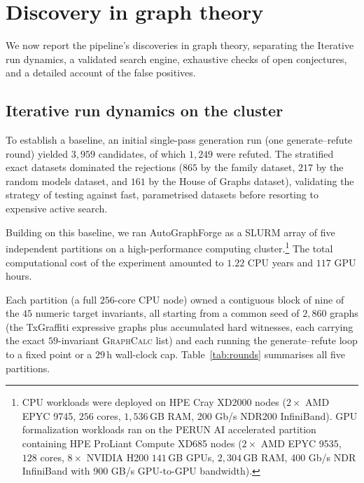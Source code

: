 \documentclass[]{ceurart}
\begin{document}
\section{Discovery in graph theory}
\label{sec:discovery}

We now report the pipeline's discoveries in graph theory, separating the
Iterative run dynamics, a validated search engine, exhaustive checks of open
conjectures, and a detailed account of the false positives.


\subsection{Iterative run dynamics on the cluster}
\label{sec:dynamics}

To establish a baseline, an initial single-pass generation run (one generate--refute round) yielded $3{,}959$ candidates, of which $1{,}249$ were refuted. The stratified exact datasets dominated the rejections ($865$ by the family dataset, $217$ by the random models dataset, and $161$ by the House of Graphs dataset), validating the strategy of testing against fast, parametrised datasets before resorting to expensive active search.

Building on this baseline, we ran \textsf{AutoGraphForge} as a SLURM array of five independent partitions on a high-performance computing cluster.\footnote{CPU workloads were deployed on HPE Cray XD2000 nodes ($2\times$ AMD EPYC 9745, $256$ cores, $1{,}536$\,GB RAM, 200 Gb/s NDR200 InfiniBand). GPU formalization workloads ran on the PERUN AI accelerated partition containing HPE ProLiant Compute XD685 nodes ($2\times$ AMD EPYC 9535, $128$ cores, $8\times$ NVIDIA H200 $141$\,GB GPUs, $2{,}304$\,GB RAM, 400 Gb/s NDR InfiniBand with 900 GB/s GPU-to-GPU bandwidth).} The total computational cost of the experiment amounted to $1.22$ CPU years and $117$ GPU hours. 

Each partition (a full $256$-core CPU node) owned a contiguous block of nine of the $45$ numeric target
invariants, all starting from a common seed of $2{,}860$ graphs (the TxGraffiti
expressive graphs plus accumulated hard witnesses, each carrying the exact
$59$-invariant \textsc{GraphCalc} list) and each running the generate--refute
loop to a fixed point or a $29$\,h wall-clock cap. Table~\ref{tab:rounds}
summarises all five partitions.
\end{document}
